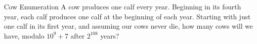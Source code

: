 \begin{problem}{Cow Enumeration}
        A cow produces one calf every year. Beginning in its fourth year, each calf produces one calf at the beginning of each year. Starting with just one calf in its first year, and assuming our cows never die, how many cows will we have, modulo \(10^9 + 7\) after \(2^{108}\) years?
\end{problem}
